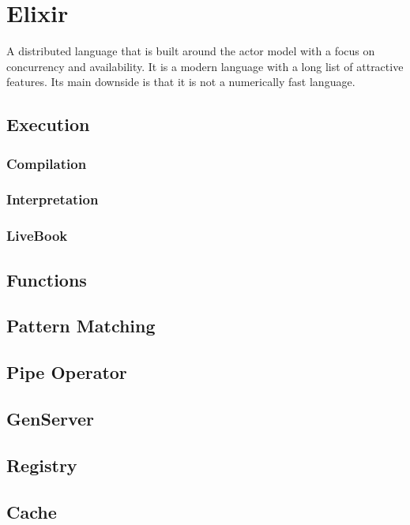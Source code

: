 \section{Elixir}

A distributed language that is built around the actor model with a focus on concurrency and availability. It is a modern language with a long list of attractive features. Its main downside is that it is not a numerically fast language.

\subsection{Execution}
\subsubsection{Compilation}
\subsubsection{Interpretation}
\subsubsection{LiveBook}

\subsection{Functions}

\subsection{Pattern Matching}

\subsection{Pipe Operator}

\subsection{GenServer}

\subsection{Registry}

\subsection{Cache}

